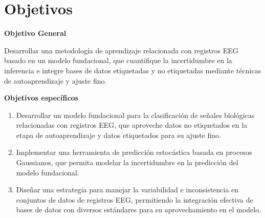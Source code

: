 \section{Objetivos}

\textbf{Objetivo General}

Desarrollar una metodología de aprendizaje relacionada con registros EEG basado en un modelo fundacional, que cuantifique la incertidumbre en la inferencia e integre bases de datos etiquetadas y no etiquetadas mediante técnicas de autoaprendizaje y ajuste fino.

\textbf{Objetivos específicos}

\begin{enumerate}
	\item Desarrollar un modelo fundacional para la clasificación de señales biológicas relacionadas con registros EEG, que aproveche datos no etiquetados en la etapa de autoaprendizaje y datos etiquetados para su ajuste fino.
	
	\item Implementar una herramienta de predicción estocástica basada en procesos Gaussianos, que permita modelar la incertidumbre en la predicción del modelo fundacional.
	
	\item Diseñar una estrategia para manejar la variabilidad e inconsistencia en conjuntos de datos de registros EEG, permitiendo la integración efectiva de bases de datos con diversos estándares para su aprovechamiento en el modelo.
\end{enumerate}